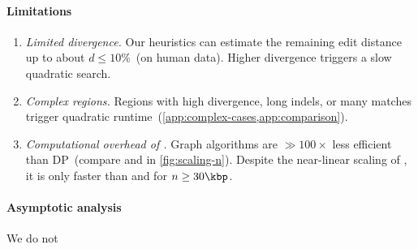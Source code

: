 \paragraph{Limitations} \phantom{x}
\nopagebreaklist

\begin{enumerate}
  \item \emph{Limited divergence.} %
        Our heuristics can estimate the remaining edit distance up to about
        $d{\leq}10\%$~(on human data). Higher divergence triggers a slow
        quadratic search.
  \item \emph{Complex regions.} %
        Regions with high divergence, long indels, or many matches trigger
        quadratic runtime~(\cref{app:complex-cases,app:comparison}).
  \item \emph{Computational overhead of \A.} %
        Graph algorithms are ${\gg} 100\times$ less efficient than DP~(compare
        \dijkstra and \edlib in \cref{fig:scaling-n}). Despite the near-linear
        scaling of \astarpa, it is only faster than \edlib and \wfa for $n \geq 30\kbp$.
\end{enumerate}

\paragraph{Asymptotic analysis}
We do not 
